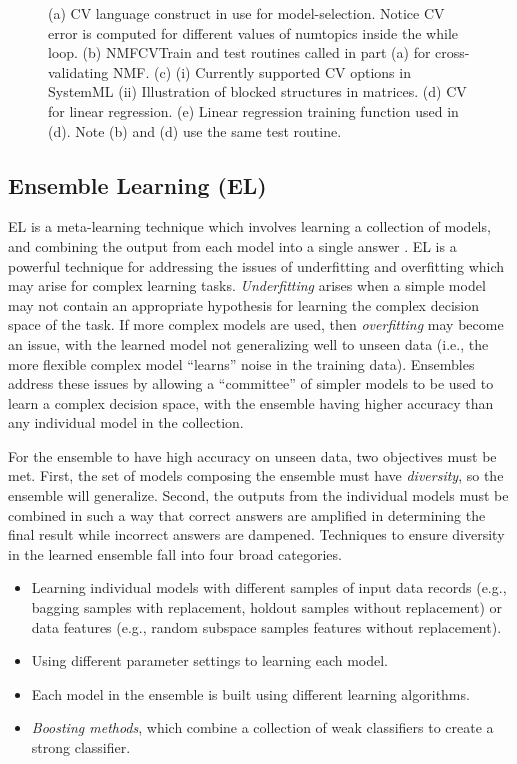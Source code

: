 \documentclass{vldb}
\begin{document}
\begin{figure}
\caption{(a) CV language construct in use for model-selection.
Notice CV error is computed for different values of numtopics inside the while loop.
(b) NMFCVTrain and test routines called in part (a) for cross-validating NMF.
(c) (i) Currently supported CV options in SystemML (ii) Illustration of blocked
structures in matrices.
(d) CV for linear regression. (e) Linear regression training function used in (d).
Note (b) and (d) use the same test routine.}
\label{fig:combination}
\end{figure}


\subsection{Ensemble Learning (EL)}
\label{sec:elbackground}

EL is a meta-learning technique which involves learning a
collection of models, and combining the output from each model
into a single answer \cite{DBLP:journals/scholarpedia/Polikar09}.
EL is a powerful technique for addressing the issues
of underfitting and overfitting which may arise for complex learning tasks.
\emph{Underfitting} arises when a simple model may not contain
an appropriate hypothesis for learning the complex decision space of the task.
If more complex models are used, then \emph{overfitting} may become an issue,
with the learned model not generalizing well to unseen data
(i.e., the more flexible complex model ``learns'' noise in the training data).
Ensembles address these issues by allowing a ``committee'' of simpler models
to be used to learn a complex decision space, with the ensemble having higher
accuracy than any individual model in the collection.

For the ensemble to have high accuracy on unseen data, two objectives must be met.
First, the set of models composing the ensemble must have \emph{diversity},
so the ensemble will generalize. Second, the outputs from the individual models
must be combined in such a way that correct answers are amplified in determining
the final result while incorrect answers are dampened. Techniques to ensure diversity
in the learned ensemble fall into four broad categories.

\begin{itemize}
\item Learning individual models with different samples of input data
records (e.g., bagging \cite{springerlink:10.1007/BF00058655} samples with replacement,
holdout samples without replacement) or data features (e.g., random subspace \cite{rsm}
samples features without replacement).

\item Using different parameter settings to learning each model.

\item Each model in the ensemble is built using different learning algorithms.

\item \emph{Boosting methods}, which combine a collection of
weak classifiers to create a strong classifier.

\end{itemize}
\end{document}
